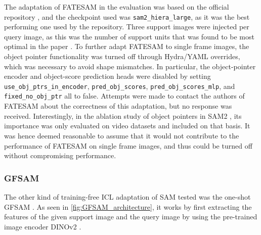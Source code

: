 The adaptation of \acs{FATESAM} in the evaluation was based on the official repository \parencite{fatesam_repo}, and the checkpoint used was \texttt{sam2\_hiera\_large}, as it was the best performing one used by the repository.
Three support images were injected per query image, as this was the number of support units that was found to be most optimal in the paper \parencite{fatesam}.
To further adapt \acs{FATESAM} to single frame images, the object pointer functionality was turned off through Hydra/YAML overrides, which was necessary to avoid shape mismatches.
In particular, the object-pointer encoder and object-score prediction heads were disabled by setting
\texttt{use\_obj\_ptrs\_in\_encoder},
\texttt{pred\_obj\_scores},
\texttt{pred\_obj\_scores\_mlp}, and 
\texttt{fixed\_no\_obj\_ptr} all to false.
Attempts were made to contact the authors of \acs{FATESAM} about the correctness of this adaptation, but no response was received.
Interestingly, in the ablation study of object pointers in \acs{SAM}2 \parencite[see][p.~15]{sam2}, its importance was only evaluated on video datasets and included on that basis.
It was hence deemed reasonable to assume that it would not contribute to the performance of \acs{FATESAM} on single frame images, and thus could be turned off without compromising performance.

\subsubsection{GFSAM} \label{subsubsec:GFSAM}
The other kind of training-free \acs{ICL} adaptation of \acs{SAM} tested was the one-shot \acs{GFSAM} \parencite[see][]{gfsam}.
As seen in \cref{fig:GFSAM_architecture}, it works by first extracting the features of the given support image and the query image by using the pre-trained image encoder DINOv2 \parencite{dinov2}.

